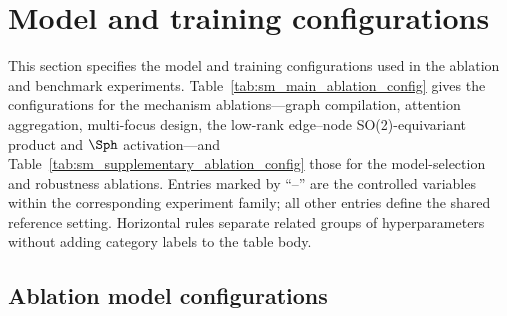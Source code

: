 \section{Model and training configurations}

This section specifies the model and training configurations used in the
ablation and benchmark experiments. Table~\ref{tab:sm_main_ablation_config}
gives the configurations for the mechanism ablations---graph compilation,
attention aggregation, multi-focus design, the low-rank edge--node
SO(2)-equivariant product and
$\Sph$ activation---and Table~\ref{tab:sm_supplementary_ablation_config} those
for the model-selection and robustness ablations. Entries marked by ``--'' are
the controlled variables within the corresponding experiment family; all other
entries define the shared reference setting. Horizontal rules separate related
groups of hyperparameters without adding category labels to the table body.

\subsection{Ablation model configurations}


